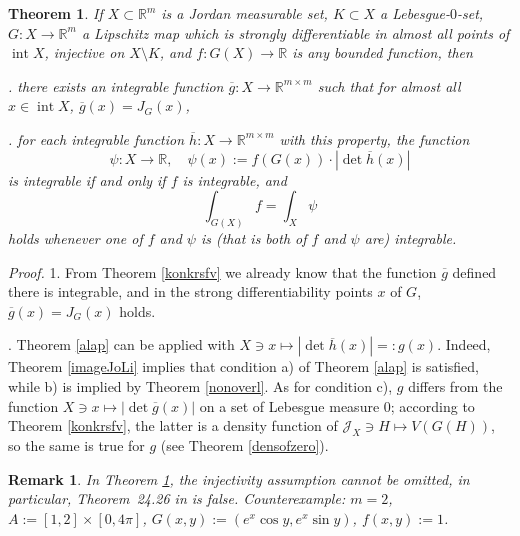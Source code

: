 \documentclass{article}
\newcommand{\proof}[1]{\textit{Proof. }#1}
\newtheorem{theorem}{Theorem}
\newtheorem{remark}{Remark}
\newcommand{\ir}{\mathop{\mathrm{int}}\nolimits}
\newcommand{\R}{\ensuremath{\mathbb R}}
\newcommand{\J}{\mathscr{J}}
\newcommand{\ol}{\overline}
\begin{document}
\begin{theorem}\label{maintheor}
If $X\subset\R^m$ is a Jordan measurable set, $K\subset X$ a
Lebesgue-$0$-set, $G:X\to\R^m$ a Lipschitz map which is strongly
differentiable in almost all points of $\ir X$, injective on
$X\setminus K$, and $f:G(X)\to\R$ is any bounded function, then

. there exists an integrable function
$\ol{g}:X\to\R^{m\times m}$ such that for almost all $x\in\ir X$,
$\ol{g}(x)=J_G(x)$,

. for each integrable function $\ol{h}:X\to\R^{m\times
m}$ with this property, the function
\[\psi:X\to\R,\quad \psi(x):=f(G(x))\cdot|\det \ol{h}(x)|\]
is integrable if and only if $f$ is integrable, and
\begin{equation} \int_{G(X)}f=\int_X\psi\end{equation}
holds whenever one of $f$ and $\psi$ is (that is both of $f$ and
$\psi$ are) integrable.
\end{theorem}

\proof{
1. From Theorem \ref{konkrsfv} we already know that the function
$\ol{g}$ defined there is integrable, and in the strong
differentiability points $x$ of $G$, $\ol{g}(x)=J_G(x)$ holds.

\noindent 2. Theorem \ref{alap} can be applied with $X\ni
x\mapsto|\det\ol{h}(x)|=:g(x)$. Indeed, Theorem \ref{imageJoLi}
implies that condition a) of Theorem \ref{alap} is satisfied,
while b) is implied by Theorem \ref{nonoverl}. As for condition
c), $g$ differs from the function $X\ni x\mapsto|\det\ol{g}(x)|$
on a set of Lebesgue measure $0$; according to Theorem
\ref{konkrsfv}, the latter is a density function of $\J_X\ni
H\mapsto V(G(H))$, so the same is true for $g$ (see Theorem
\ref{densofzero}).
}%
\begin{remark}
In Theorem \ref{maintheor}, the injectivity assumption cannot be
omitted, in particular, Theorem~24.26 in \cite{Bartle:64} is
false. Counterexample: $m=2$, $A:=[1,2]\times[0,4\pi]$,
$G(x,y):=(e^x\cos y,e^x\sin y)$, $f(x,y):=1$.
\end{remark}
\end{document}
